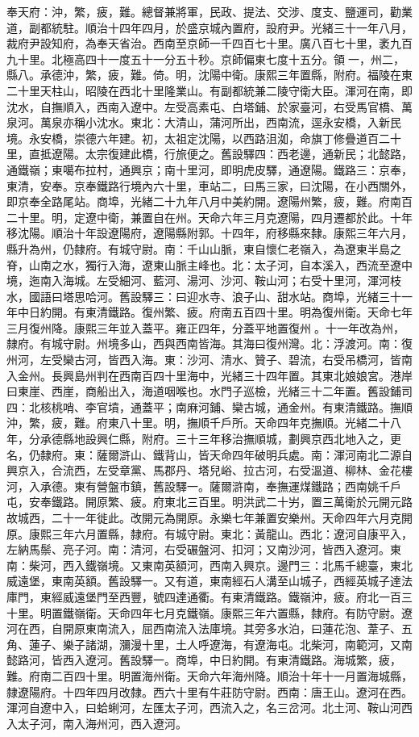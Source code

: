 \begin{pinyinscope}
奉天府：沖，繁，疲，難。總督兼將軍，民政、提法、交涉、度支、鹽運司，勸業道，副都統駐。順治十四年四月，於盛京城內置府，設府尹。光緒三十一年八月，裁府尹設知府，為奉天省治。西南至京師一千四百七十里。廣八百七十里，袤九百九十里。北極高四十一度五十一分五十秒。京師偏東七度十五分。領一，州二，縣八。承德沖，繁，疲，難。倚。明，沈陽中衛。康熙三年置縣，附府。福陵在東二十里天柱山，昭陵在西北十里隆業山。有副都統兼二陵守衛大臣。渾河在南，即沈水，自撫順入，西南入遼中。左受高素屯、白塔鋪、於家臺河，右受馬官橋、萬泉河。萬泉亦稱小沈水。東北：大清山，蒲河所出，西南流，逕永安橋，入新民境。永安橋，崇德六年建。初，太祖定沈陽，以西路沮洳，命旗丁修疊道百二十里，直抵遼陽。太宗復建此橋，行旅便之。舊設驛四：西老邊，通新民；北懿路，通鐵嶺；東噶布拉村，通興京；南十里河，即明虎皮驛，通遼陽。鐵路三：京奉，東清，安奉。京奉鐵路行境內六十里，車站二，曰馬三家，曰沈陽，在小西關外，即京奉全路尾站。商埠，光緒二十九年八月中美約開。遼陽州繁，疲，難。府南百二十里。明，定遼中衛，兼置自在州。天命六年三月克遼陽，四月遷都於此。十年移沈陽。順治十年設遼陽府，遼陽縣附郭。十四年，府移縣來隸。康熙三年六月，縣升為州，仍隸府。有城守尉。南：千山山脈，東自懷仁老嶺入，為遼東半島之脊，山南之水，獨行入海，遼東山脈主峰也。北：太子河，自本溪入，西流至遼中境，迤南入海城。左受細河、藍河、湯河、沙河、鞍山河；右受十里河，渾河枝水，國語曰塔思哈河。舊設驛三：曰迎水寺、浪子山、甜水站。商埠，光緒三十一年中日約開。有東清鐵路。復州繁、疲。府南五百四十里。明為復州衛。天命七年三月復州降。康熙三年並入蓋平。雍正四年，分蓋平地置復州。十一年改為州，隸府。有城守尉。州境多山，西與西南皆海。其海曰復州灣。北：浮渡河。南：復州河，左受欒古河，皆西入海。東：沙河、清水、贊子、碧流，右受吊橋河，皆南入金州。長興島州判在西南百四十里海中，光緒三十四年置。其東北娘娘宮。港岸曰東崖、西崖，商船出入，海道咽喉也。水門子巡檢，光緒三十二年置。舊設鋪司四：北核桃哨、李官墳，通蓋平；南麻河鋪、欒古城，通金州。有東清鐵路。撫順沖，繁，疲，難。府東八十里。明，撫順千戶所。天命四年克撫順。光緒二十八年，分承德縣地設興仁縣，附府。三十三年移治撫順城，劃興京西北地入之，更名，仍隸府。東：薩爾滸山、鐵背山，皆天命四年破明兵處。南：渾河南北二源自興京入，合流西，左受章黨、馬郡丹、塔兒峪、拉古河，右受溫道、柳林、金花樓河，入承德。東有營盤市鎮，舊設驛一。薩爾滸南，奉撫運煤鐵路；西南姚千戶屯，安奉鐵路。開原繁、疲。府東北三百里。明洪武二十屴，置三萬衛於元開元路故城西，二十一年徙此。改開元為開原。永樂七年兼置安樂州。天命四年六月克開原。康熙三年六月置縣，隸府。有城守尉。東北：黃龍山。西北：遼河自康平入，左納馬鬃、亮子河。南：清河，右受碾盤河、扣河；又南沙河，皆西入遼河。東南：柴河，西入鐵嶺境。又東南英額河，西南入興京。邊門三：北馬千總臺，東北威遠堡，東南英額。舊設驛一。又有道，東南經石人溝至山城子，西經英城子達法庫門，東經威遠堡門至西豐，號四達通衢。有東清鐵路。鐵嶺沖，疲。府北一百三十里。明置鐵嶺衛。天命四年七月克鐵嶺。康熙三年六置縣，隸府。有防守尉。遼河在西，自開原東南流入，屈西南流入法庫境。其旁多水泊，曰蓮花泡、葦子、五角、蓮子、樂子諸湖，瀰漫十里，土人呼遼海，有遼海屯。北柴河，南範河，又南懿路河，皆西入遼河。舊設驛一。商埠，中日約開。有東清鐵路。海城繁，疲，難。府南二百四十里。明置海州衛。天命六年海州降。順治十年十一月置海城縣，隸遼陽府。十四年四月改隸。西六十里有牛莊防守尉。西南：唐王山。遼河在西。渾河自遼中入，曰蛤蜊河，左匯太子河，西流入之，名三岔河。北土河、鞍山河西入太子河，南入海州河，西入遼河。
\end{pinyinscope}
